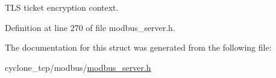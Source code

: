 T\+LS ticket encryption context. 



Definition at line 270 of file modbus\+\_\+server.\+h.



The documentation for this struct was generated from the following file\+:\begin{DoxyCompactItemize}
\item 
cyclone\+\_\+tcp/modbus/\hyperlink{modbus__server_8h}{modbus\+\_\+server.\+h}\end{DoxyCompactItemize}
